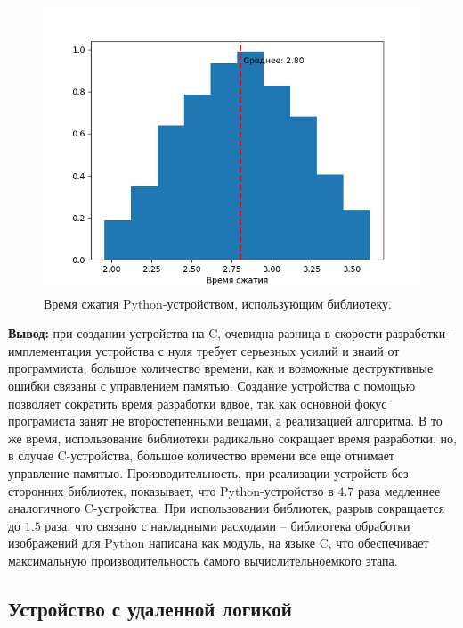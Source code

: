 \begin{figure}[!htbp]
    \centering
    \begin{adjustbox}{max totalsize={0.8\textwidth}{\textheight}}
        \includegraphics{images/hist-lib-py-dev.png}
    \end{adjustbox}
    \caption{Время сжатия Python-устройством, использующим библиотеку.}\label{fig:hist-lib-py-dev}
\end{figure}

\textbf{Вывод:} при создании устройства на C, очевидна разница
в скорости разработки -- имплементация устройства с нуля
требует серьезных усилий и знаий от программиста, большое количество
времени, как и возможные деструктивные ошибки связаны с управлением
памятью. Создание устройства с помощью {\mylanguage} позволяет
сократить время разработки вдвое, так как основной фокус програмиста
занят не второстепенными вещами, а реализацией алгоритма.
В то же время, использование библиотеки радикально сокращает
время разработки, но, в случае C-устройства, большое количество
времени все еще отнимает управление памятью.
Производительность, при реализации устройств без сторонних
библиотек, показывает, что Python-устройство в $4.7$ раза
медленнее аналогичного C-устройства. При использовании
библиотек, разрыв сокращается до $1.5$ раза, что связано
с накладными расходами -- библиотека обработки изображений
для Python написана как модуль, на языке C, что обеспечивает
максимальную производительность самого вычислительноемкого этапа.

\subsection{Устройство с удаленной логикой}\label{sec:ch3/sec2/sec2}


